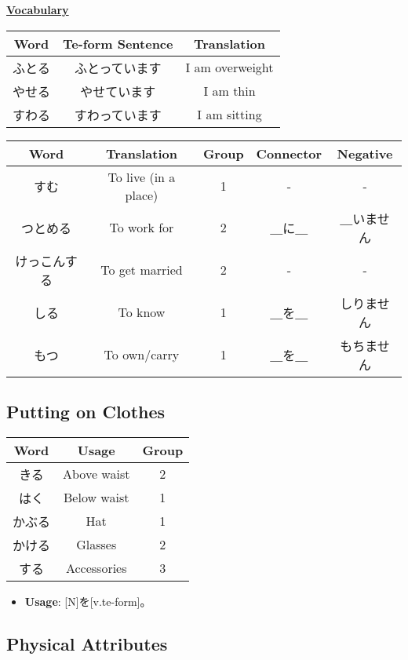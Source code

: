 \documentclass{article}
\begin{document}
\begin{CJK}{UTF8}{min}
\bigskip

\textbf{\uline{Vocabulary}}\\

\begin{tabular}{ | c | c | c | }
\hline
Word & Te-form Sentence & Translation\\
\hline
ふとる & ふとっています & I am overweight\\
やせる & やせています & I am thin\\
すわる & すわっています & I am sitting\\
\hline
\end{tabular}

\bigskip

\begin{tabular}{ | c | c | c | c | c | }
\hline
Word & Translation & Group & Connector & Negative\\
\hline
\hline
すむ & To live (in a place) & 1 & - & -\\
つとめる & To work for & 2 & ＿に＿ & ＿いません\\
けっこんする & To get married & 2 & - & -\\
\hline
しる & To know & 1 & ＿を＿ & しりません\\
\hline
もつ & To own/carry & 1 & ＿を＿ & もちません\\
\hline
\end{tabular}


\subsection{Putting on Clothes}

\begin{tabular}{ | c | c | c | }
\hline
Word & Usage & Group\\
\hline
きる & Above waist & 2\\
はく & Below waist & 1\\
かぶる & Hat & 1\\
かける & Glasses & 2\\
する & Accessories & 3\\
\hline
\end{tabular}
\begin{itemize}
\item \textbf{Usage}: [N]を[v.te-form]。
\end{itemize}


\subsection{Physical Attributes}


\end{CJK}
\end{document}
